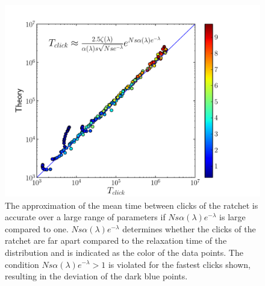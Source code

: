 \documentclass[prl,preprint]{revtex4}
\begin{document}
\begin{figure}[htp]
\begin{center}
  \includegraphics[width=0.7\columnwidth]{Figures/explicit_theory_simulation_comparison.pdf}
  \caption[labelInTOC]{The approximation of the mean time between clicks of the ratchet is accurate over a large range of parameters if $Ns\alpha(\lambda)e^{-\lambda}$ is large compared to one. $Ns\alpha(\lambda)e^{-\lambda}$ determines whether the clicks of the ratchet are far apart compared to the relaxation time of the distribution and is indicated as the color of the data points. The condition  $Ns\alpha(\lambda)e^{-\lambda}>1$ is violated for the fastest clicks shown, resulting in the deviation of the dark blue points.}
  \label{fig:explicit}
\end{center}
\end{figure}


\end{document}
